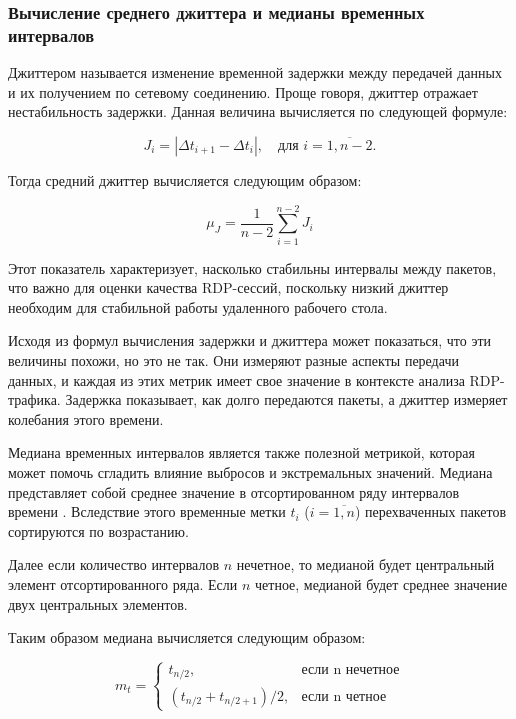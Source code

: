 \documentclass[bachelor, och, coursework]{SCWorks}
\begin{document}
\subsubsection{Вычисление среднего джиттера и медианы временных интервалов}

   Джиттером называется изменение временной задержки между передачей данных и их получением по сетевому соединению.
   Проще говоря, джиттер отражает нестабильность задержки. Данная величина вычисляется по следующей формуле:

   \begin{equation}
      J_i = |\Delta t_{i+1} - \Delta t_i|, \quad \text{для } i = \overline{1, n - 2}.
   \end{equation}

  Тогда средний джиттер вычисляется следующим образом:

   \begin{equation}
    \mu_J = \frac{1}{n-2} \sum_{i=1}^{n-2} J_i
   \end{equation}

   Этот показатель характеризует, насколько стабильны интервалы между пакетов, что важно для оценки качества RDP-сессий, 
   поскольку низкий джиттер необходим для стабильной работы удаленного рабочего стола. 
   
   Исходя из формул вычисления задержки и джиттера может показаться, что эти величины похожи, но это не так. Они измеряют разные 
   аспекты передачи данных, и каждая из этих метрик имеет свое значение в контексте анализа RDP-трафика. Задержка показывает, как долго 
   передаются пакеты, а джиттер измеряет колебания этого времени.

   Медиана временных интервалов является также полезной метрикой, которая может помочь сгладить влияние выбросов и экстремальных значений. 
   Медиана представляет собой среднее значение в отсортированном ряду интервалов времени \cite{dev0}. Вследствие этого временные метки $t_i$ ($i = \overline{1, n}$) 
   перехваченных пакетов сортируются по возрастанию.
   
   Далее если количество интервалов $ n $ нечетное, то медианой будет центральный элемент отсортированного ряда. 
   Если $ n $ четное, медианой будет среднее значение двух центральных элементов.

   Таким образом медиана вычисляется следующим образом:

   \begin{equation}
    m_t = 
      \begin{cases}
        t_{n / 2}, & \text{если n нечетное}\\
        (t_{n / 2} + t_{n / 2 + 1}) / 2, & \text{если n четное}
      \end{cases}
   \end{equation}
  
\end{document}
